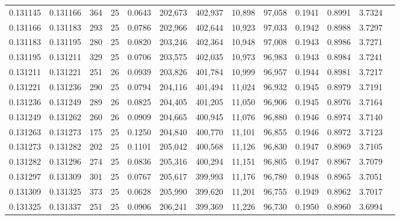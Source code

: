 \begin{tabular}{rrrrrrrrrrrrr}
0.131145 & 0.131166 &   364 &  25 &                                     0.0643 & 202,673 & 402,937 &  10,898 &  97,058 & 0.1941 & 0.8991 & 3.7324 \\
0.131166 & 0.131183 &   293 &  25 &                                     0.0786 & 202,966 & 402,644 &  10,923 &  97,033 & 0.1942 & 0.8988 & 3.7297 \\
0.131183 & 0.131195 &   280 &  25 &                                     0.0820 & 203,246 & 402,364 &  10,948 &  97,008 & 0.1943 & 0.8986 & 3.7271 \\
0.131195 & 0.131211 &   329 &  25 &                                     0.0706 & 203,575 & 402,035 &  10,973 &  96,983 & 0.1943 & 0.8984 & 3.7241 \\
0.131211 & 0.131221 &   251 &  26 &                                     0.0939 & 203,826 & 401,784 &  10,999 &  96,957 & 0.1944 & 0.8981 & 3.7217 \\
0.131221 & 0.131236 &   290 &  25 &                                     0.0794 & 204,116 & 401,494 &  11,024 &  96,932 & 0.1945 & 0.8979 & 3.7191 \\
0.131236 & 0.131249 &   289 &  26 &                                     0.0825 & 204,405 & 401,205 &  11,050 &  96,906 & 0.1945 & 0.8976 & 3.7164 \\
0.131249 & 0.131262 &   260 &  26 &                                     0.0909 & 204,665 & 400,945 &  11,076 &  96,880 & 0.1946 & 0.8974 & 3.7140 \\
0.131263 & 0.131273 &   175 &  25 &                                     0.1250 & 204,840 & 400,770 &  11,101 &  96,855 & 0.1946 & 0.8972 & 3.7123 \\
0.131273 & 0.131282 &   202 &  25 &                                     0.1101 & 205,042 & 400,568 &  11,126 &  96,830 & 0.1947 & 0.8969 & 3.7105 \\
0.131282 & 0.131296 &   274 &  25 &                                     0.0836 & 205,316 & 400,294 &  11,151 &  96,805 & 0.1947 & 0.8967 & 3.7079 \\
0.131297 & 0.131309 &   301 &  25 &                                     0.0767 & 205,617 & 399,993 &  11,176 &  96,780 & 0.1948 & 0.8965 & 3.7051 \\
0.131309 & 0.131325 &   373 &  25 &                                     0.0628 & 205,990 & 399,620 &  11,201 &  96,755 & 0.1949 & 0.8962 & 3.7017 \\
0.131325 & 0.131337 &   251 &  25 &                                     0.0906 & 206,241 & 399,369 &  11,226 &  96,730 & 0.1950 & 0.8960 & 3.6994 \\

\end{tabular}
